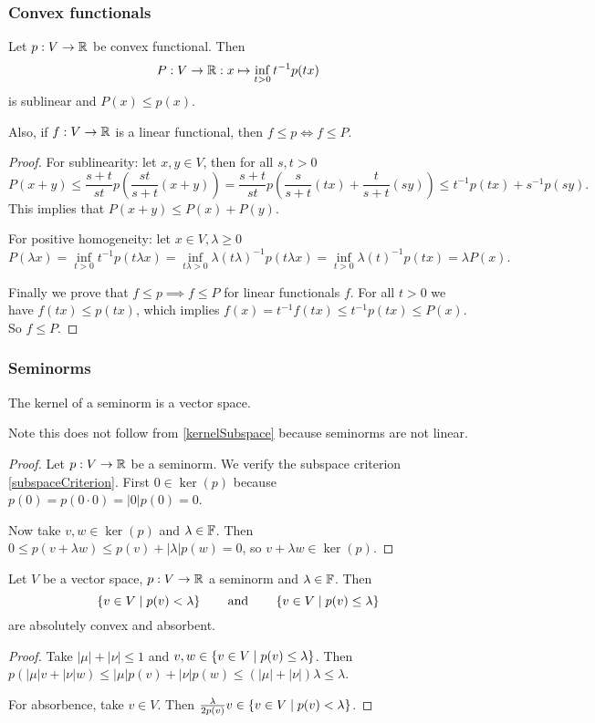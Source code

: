 \subsubsection{Convex functionals}

\begin{proposition}
Let $p: V\to\mathbb{R}$ be convex functional. Then
\[ P: V\to\mathbb{R}: x\mapsto \inf_{t>0} t^{-1}p(tx) \]
is sublinear and $P(x)\leq p(x)$.

Also, if $f:V\to \mathbb{R}$ is a linear functional, then $f\leq p \iff f\leq P$.
\end{proposition}
\begin{proof}
For sublinearity: let $x,y\in V$, then for all $s,t>0$
\[ P(x+y) \leq \frac{s+t}{st}p\left(\frac{st}{s+t}(x+y)\right) = \frac{s+t}{st}p\left(\frac{s}{s+t}(tx)+\frac{t}{s+t}(sy)\right) \leq t^{-1}p(tx) + s^{-1}p(sy). \]
This implies that $P(x+y)\leq P(x)+P(y)$.

For positive homogeneity: let $x\in V,\lambda\geq 0$
\[ P(\lambda x) = \inf_{t>0} t^{-1}p(t\lambda x) = \inf_{t\lambda>0} \lambda (t\lambda)^{-1}p(t\lambda x) = \inf_{t>0} \lambda (t)^{-1}p(tx) = \lambda P(x). \]

Finally we prove that $f\leq p \implies f\leq P$ for linear functionals $f$. For all $t>0$ we have $f(tx) \leq p(tx)$, which implies $f(x) = t^{-1}f(tx) \leq t^{-1}p(tx) \leq P(x)$. So $f\leq P$.
\end{proof}

\subsubsection{Seminorms}
\begin{lemma}
The kernel of a seminorm is a vector space.
\end{lemma}
Note this does not follow from \ref{kernelSubspace} because seminorms are not linear.
\begin{proof}
Let $p:V\to \mathbb{R}$ be a seminorm. We verify the subspace criterion \ref{subspaceCriterion}. First $0\in\ker(p)$ because $p(0) = p(0\cdot 0) = |0|p(0) = 0$.

Now take $v,w\in \ker(p)$ and $\lambda\in \mathbb{F}$. Then $0\leq p(v+\lambda w) \leq p(v)+|\lambda|p(w) = 0$, so $v+\lambda w\in\ker(p)$.
\end{proof}

\begin{proposition} \label{gaugeSeminorms}
Let $V$ be a vector space, $p: V\to \mathbb{R}$ a seminorm and $\lambda\in \mathbb{F}$. Then
\[ \left\{ v\in V \;\middle|\; p(v) < \lambda \right\} \qquad\text{and}\qquad \left\{ v\in V \;\middle|\; p(v) \leq \lambda \right\} \]
are absolutely convex and absorbent.
\end{proposition}
\begin{proof}
Take $|\mu| + |\nu| \leq 1$ and $v,w\in\left\{ v\in V \;\middle|\; p(v) \leq \lambda \right\}$. Then $p(|\mu|v + |\nu|w)\leq |\mu|p(v) + |\nu|p(w) \leq (|\mu|+|\nu|)\lambda \leq \lambda$.

For absorbence, take $v\in V$. Then $\frac{\lambda}{2p(v)} v\in \left\{ v\in V \;\middle|\; p(v) < \lambda \right\}$.
\end{proof}

